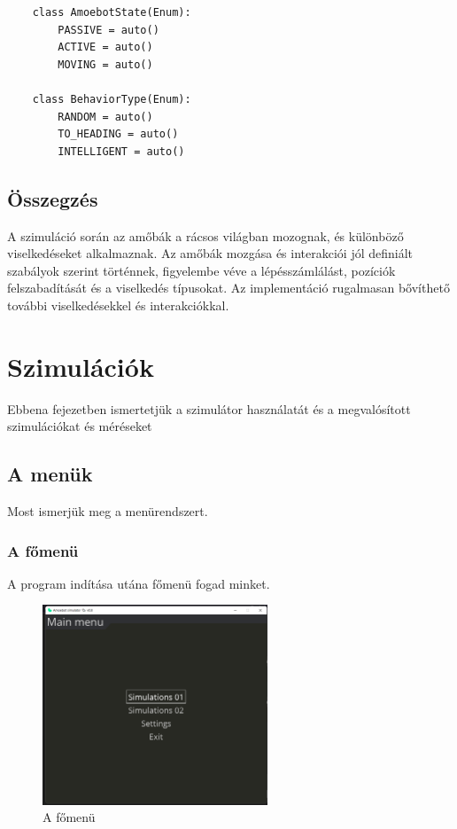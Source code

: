 \documentclass[	
  noindent
]{elteikthesis}[2024/04/26]
\begin{document}
    \begin{verbatim}
    class AmoebotState(Enum):
        PASSIVE = auto()
        ACTIVE = auto()
        MOVING = auto()
    
    class BehaviorType(Enum):
        RANDOM = auto()
        TO_HEADING = auto()
        INTELLIGENT = auto()
    \end{verbatim}
    
    \section{Összegzés}
    A szimuláció során az amőbák a rácsos világban mozognak, és különböző viselkedéseket alkalmaznak. Az amőbák mozgása és interakciói jól definiált szabályok szerint történnek, figyelembe véve a lépésszámlálást, pozíciók felszabadítását és a viselkedés típusokat. Az implementáció rugalmasan bővíthető további viselkedésekkel és interakciókkal.
    
\chapter{Szimulációk}
    Ebbena  fejezetben ismertetjük a szimulátor használatát és a megvalósított szimulációkat és méréseket
    \section{A menük}
      Most ismerjük meg a menürendszert.

      \subsection{A főmenü}
        A program indítása utána  főmenü fogad minket.

        \begin{figure}[H]
          \centering
          \includegraphics[width=0.6\textwidth]{images/simulatons/main_menu.png}
          \caption{A főmenü}
          \label{fig:main_menu}
        \end{figure}
\end{document}
